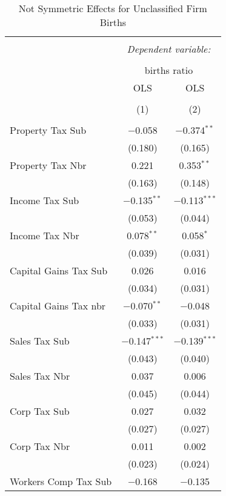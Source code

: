 
\begin{table}[!htbp] \centering 
  \caption{Not Symmetric Effects for  Unclassified Firm Births} 
  \label{99noequality} 
\footnotesize 
\begin{tabular}{@{\extracolsep{5pt}}lcc} 
\\[-1.8ex]\hline 
\hline \\[-1.8ex] 
 & \multicolumn{2}{c}{\textit{Dependent variable:}} \\ 
\cline{2-3} 
\\[-1.8ex] & \multicolumn{2}{c}{births ratio} \\ 
 & OLS & OLS \\ 
\\[-1.8ex] & (1) & (2)\\ 
\hline \\[-1.8ex] 
 Property Tax Sub & $-$0.058 & $-$0.374$^{**}$ \\ 
  & (0.180) & (0.165) \\ 
  Property Tax Nbr & 0.221 & 0.353$^{**}$ \\ 
  & (0.163) & (0.148) \\ 
  Income Tax Sub & $-$0.135$^{**}$ & $-$0.113$^{***}$ \\ 
  & (0.053) & (0.044) \\ 
  Income Tax Nbr & 0.078$^{**}$ & 0.058$^{*}$ \\ 
  & (0.039) & (0.031) \\ 
  Capital Gains Tax Sub & 0.026 & 0.016 \\ 
  & (0.034) & (0.031) \\ 
  Capital Gains Tax nbr & $-$0.070$^{**}$ & $-$0.048 \\ 
  & (0.033) & (0.031) \\ 
  Sales Tax Sub & $-$0.147$^{***}$ & $-$0.139$^{***}$ \\ 
  & (0.043) & (0.040) \\ 
  Sales Tax Nbr & 0.037 & 0.006 \\ 
  & (0.045) & (0.044) \\ 
  Corp Tax Sub & 0.027 & 0.032 \\ 
  & (0.027) & (0.027) \\ 
  Corp Tax Nbr & 0.011 & 0.002 \\ 
  & (0.023) & (0.024) \\ 
  Workers Comp Tax Sub & $-$0.168 & $-$0.135 \\ 

\end{tabular}
\end{table}
